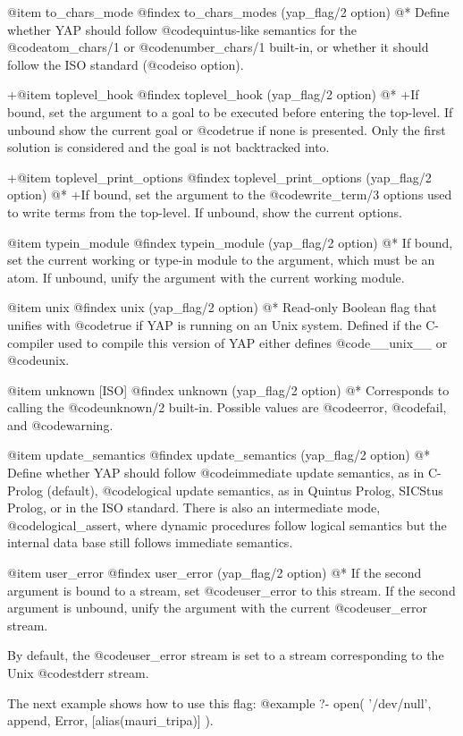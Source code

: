 {{{{{{{{@item to_chars_mode
@findex to_chars_modes (yap_flag/2 option)
@* Define whether YAP should follow @code{quintus}-like
semantics for the @code{atom_chars/1} or @code{number_chars/1} built-in,
or whether it should follow the ISO standard (@code{iso} option).

+@item toplevel_hook
@findex toplevel_hook (yap_flag/2 option)
@*
+If bound, set the argument to a goal to be executed before entering the
top-level. If unbound show the current goal or @code{true} if none is
presented. Only the first solution is considered and the goal is not
backtracked into.

+@item toplevel_print_options
@findex toplevel_print_options (yap_flag/2 option)
@*
+If bound, set the argument to the @code{write_term/3} options used to write
terms from the top-level. If unbound, show the current options.

@item typein_module
@findex typein_module (yap_flag/2 option)
@*
If bound, set the current working or type-in module to the argument,
which must be an atom. If unbound, unify the argument with the current
working module.

@item  unix
@findex unix (yap_flag/2 option)
@* Read-only Boolean flag that unifies with @code{true} if YAP is
running on an Unix system.  Defined if the C-compiler used to compile
this version of YAP either defines @code{__unix__} or @code{unix}.

@item unknown [ISO]
@findex unknown (yap_flag/2 option)
@*
Corresponds to calling the @code{unknown/2} built-in. Possible values 
are @code{error}, @code{fail}, and @code{warning}.

@item update_semantics
@findex update_semantics (yap_flag/2 option)
@*
Define whether YAP should follow @code{immediate} update
semantics, as in C-Prolog (default), @code{logical} update semantics,
as in Quintus Prolog, SICStus Prolog, or in the ISO standard. There is
also an intermediate mode, @code{logical_assert}, where dynamic
procedures follow logical semantics but the internal data base still
follows immediate semantics.

@item user_error
@findex user_error (yap_flag/2 option)
@*
If the second argument is bound to a stream, set @code{user_error} to
this stream. If the second argument is unbound, unify the argument with
the current @code{user_error} stream.

By default, the @code{user_error} stream is set to a stream
corresponding to the Unix @code{stderr} stream.

The next example shows how to use this flag:
@example
   ?- open( '/dev/null', append, Error,
           [alias(mauri_tripa)] ).

}}}}}}}}
